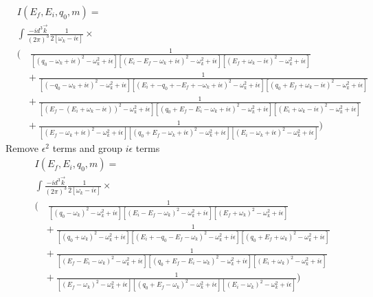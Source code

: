 \begin{align*}
&I(E_f, E_i, q_0, m) = \\
&\int \frac{-i d^3 \vec{k}}{(2\pi)^3}\frac{1}{2\left[\omega_k - i \epsilon\right]} \times\\
&\bigg(\quad\frac{1}{
\left[(q_0 - \omega_k + i \epsilon)^2 - \omega_k^2 + i\epsilon\right]
\left[(E_i - E_f - \omega_k + i \epsilon)^2 - \omega_k^2 + i\epsilon\right]
\left[(E_f + \omega_k - i \epsilon)^2 - \omega_k^2 + i\epsilon\right]
} \\
&\quad + \frac{1}{
\left[( - q_0  - \omega_k + i \epsilon)^2 - \omega_k^2 + i\epsilon\right]
\left[(E_i + -q_0 + -E_f + -\omega_k + i \epsilon)^2 - \omega_k^2 + i\epsilon\right]
\left[(q_0 + E_f + \omega_k - i \epsilon)^2 - \omega_k^2 + i\epsilon\right]
} \\
&\quad + \frac{1}{
\left[(E_f - (E_i + \omega_k - i \epsilon))^2 - \omega_k^2 + i\epsilon\right]
\left[(q_0 + E_f - E_i - \omega_k + i \epsilon)^2 - \omega_k^2 + i\epsilon\right]
\left[(E_i + \omega_k - i \epsilon)^2 - \omega_k^2 + i\epsilon\right]
} \\
&\quad + \frac{1}{
\left[(E_f - \omega_k + i \epsilon)^2 - \omega_k^2 + i\epsilon\right]
\left[(q_0 + E_f - \omega_k + i \epsilon)^2 - \omega_k^2 + i\epsilon\right]
\left[(E_i - \omega_k + i \epsilon)^2 - \omega_k^2 + i\epsilon\right]
} \bigg)
\end{align*}
Remove $\epsilon^2$ terms and group $i\epsilon$ terms
\begin{align*}
&I(E_f, E_i, q_0, m) = \\
&\int \frac{-i d^3 \vec{k}}{(2\pi)^3}\frac{1}{2\left[\omega_k - i \epsilon\right]} \times\\
&\bigg(\quad\frac{1}{
\left[(q_0 - \omega_k)^2 - \omega_k^2 + i\epsilon\right]
\left[(E_i - E_f - \omega_k)^2 - \omega_k^2 + i\epsilon\right]
\left[(E_f + \omega_k)^2 - \omega_k^2 + i\epsilon\right]
} \\
&\quad + \frac{1}{
\left[( q_0  + \omega_k)^2 - \omega_k^2 + i\epsilon\right]
\left[(E_i + -q_0  -E_f  -\omega_k )^2 - \omega_k^2 + i\epsilon\right]
\left[(q_0 + E_f + \omega_k )^2 - \omega_k^2 + i\epsilon\right]
} \\
&\quad + \frac{1}{
\left[(E_f - E_i - \omega_k)^2 - \omega_k^2 + i\epsilon\right]
\left[(q_0 + E_f - E_i - \omega_k)^2 - \omega_k^2 + i\epsilon\right]
\left[(E_i + \omega_k)^2 - \omega_k^2 + i\epsilon\right]
} \\
&\quad + \frac{1}{
\left[(E_f - \omega_k)^2 - \omega_k^2 + i\epsilon\right]
\left[(q_0 + E_f - \omega_k)^2 - \omega_k^2 + i\epsilon\right]
\left[(E_i - \omega_k)^2 - \omega_k^2 + i\epsilon\right]
} \bigg)
\end{align*}
